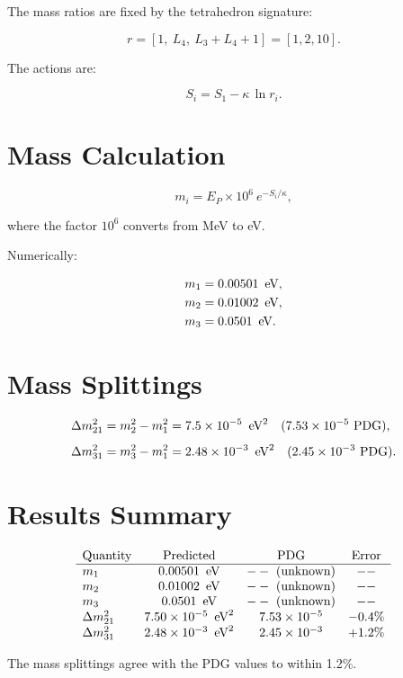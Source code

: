 The mass ratios are fixed by the tetrahedron signature:

\[
r = [1,\ L_4,\ L_3+L_4+1] = [1, 2, 10].
\]

The actions are:

\[
S_i = S_1 - \kappa\,\ln r_i.
\]

\section{Mass Calculation}

\[
m_i = E_P \times 10^6\ e^{-S_i/\kappa},
\]

where the factor \(10^6\) converts from MeV to eV.

Numerically:

\[
\begin{aligned}
m_1 &= 0.00501\ \,\text{eV}, \\
m_2 &= 0.01002\ \,\text{eV}, \\
m_3 &= 0.0501\ \,\text{eV}.
\end{aligned}
\]

\section{Mass Splittings}

\[
\begin{aligned}
\Delta m_{21}^2 &= m_2^2 - m_1^2
    = 7.5 \times 10^{-5}\ \,\text{eV}^2
    \quad (7.53 \times 10^{-5}\ \text{PDG}), \\[4pt]
\Delta m_{31}^2 &= m_3^2 - m_1^2
    = 2.48 \times 10^{-3}\ \,\text{eV}^2
    \quad (2.45 \times 10^{-3}\ \text{PDG}).
\end{aligned}
\]

\section{Results Summary}

\[
\begin{array}{lccc}
\text{Quantity} & \text{Predicted} & \text{PDG} & \text{Error} \\
\hline
m_1 & 0.00501\ \,\text{eV} & --\ (\text{unknown}) & -- \\
m_2 & 0.01002\ \,\text{eV} & --\ (\text{unknown}) & -- \\
m_3 & 0.0501\ \,\text{eV} & --\ (\text{unknown}) & -- \\
\Delta m_{21}^2 & 7.50\times 10^{-5}\ \,\text{eV}^2 & 7.53\times 10^{-5} & -0.4\% \\
\Delta m_{31}^2 & 2.48\times 10^{-3}\ \,\text{eV}^2 & 2.45\times 10^{-3} & +1.2\% \\
\end{array}
\]

The mass splittings agree with the PDG values to within 1.2\%.
